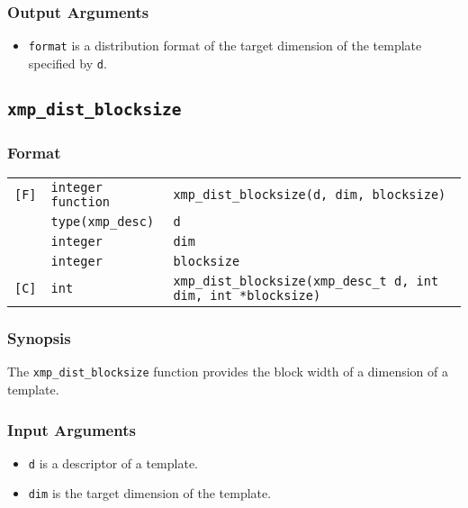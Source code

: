 \subsubsection*{Output Arguments}
\begin{itemize}
 \item {\tt format} is a distribution format of the target dimension of
       the template specified by {\tt d}.
\end{itemize}


\subsection{\tt xmp\_dist\_blocksize}

\subsubsection*{Format}

\begin{tabular}{lll}

\verb![F]!& {\tt integer function}& {\tt xmp\_dist\_blocksize(d, dim, blocksize)}\\
          & {\tt type(xmp\_desc)} & {\tt d}\\
          & {\tt integer} & {\tt dim}\\
          & {\tt integer} & {\tt blocksize}\\

\verb![C]!&  {\tt int}& {\tt xmp\_dist\_blocksize(xmp\_desc\_t d, int dim, int *blocksize)}\\

\end{tabular}

\subsubsection*{Synopsis}

The {\tt xmp\_dist\_blocksize} function provides the block width of
a dimension of a template.


\subsubsection*{Input Arguments}
\begin{itemize}
 \item {\tt d} is a descriptor of a template.
        \item {\tt dim} is the target dimension of the template.
\end{itemize}

